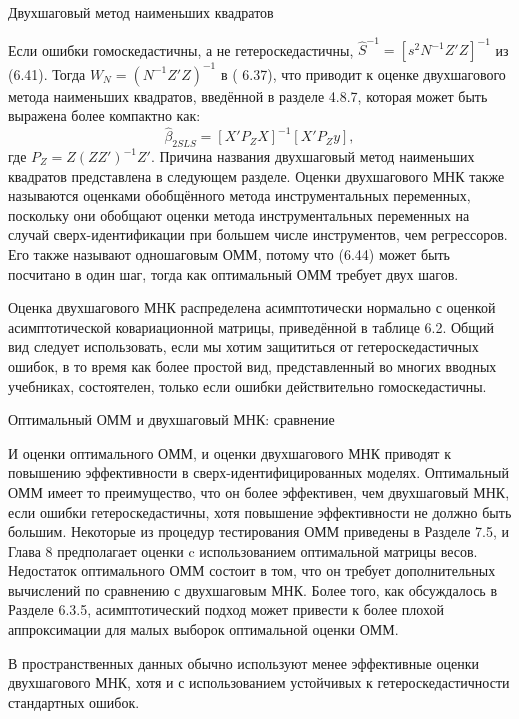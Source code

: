 \begin{center}
Двухшаговый метод наименьших квадратов
\end{center}

Если ошибки гомоскедастичны, а не гетероскедастичны, ${\hat{S}}^{-1}=[s^2 N^{-1} Z' Z]^{-1}$ из (6.41). Тогда $W_N=(N^{-1}Z'Z)^{-1}$ в ( 6.37), что приводит к оценке двухшагового метода наименьших квадратов, введённой в разделе 4.8.7, которая может быть выражена более компактно как:
\begin{equation}
\hat{\beta}_{2SLS}=[X' P_{Z} X]^{-1} [X' P_{Z} y],
\end{equation}
где $P_{Z}=Z(ZZ')^{-1}Z'$. Причина названия двухшаговый метод наименьших квадратов представлена в следующем разделе. Оценки двухшагового МНК также называются оценками обобщённого метода инструментальных переменных, поскольку они обобщают оценки метода инструментальных переменных на случай сверх-идентификации при большем числе инструментов, чем регрессоров. Его также называют одношаговым ОММ, потому что (6.44) может быть посчитано в один шаг, тогда как оптимальный ОММ требует двух шагов.

Оценка двухшагового МНК распределена асимптотически нормально с оценкой асимптотической ковариационной матрицы, приведённой в таблице 6.2. Общий вид следует использовать, если мы хотим защититься от гетероскедастичных ошибок, в то время как более простой вид, представленный во многих вводных учебниках, состоятелен, только если ошибки действительно гомоскедастичны.

\begin{center}
Оптимальный ОММ и двухшаговый МНК: сравнение
\end{center}

И оценки оптимального ОММ, и оценки двухшагового МНК приводят к повышению эффективности в сверх-идентифицированных моделях. Оптимальный ОММ имеет то преимущество, что он более эффективен, чем двухшаговый МНК, если ошибки гетероскедастичны, хотя повышение эффективности не должно быть большим. Некоторые из процедур тестирования ОММ приведены в Разделе 7.5, и Глава 8 предполагает оценки c использованием оптимальной матрицы весов. Недостаток оптимального ОММ состоит в том, что он требует дополнительных вычислений по сравнению с двухшаговым МНК. Более того, как обсуждалось в Разделе 6.3.5, асимптотический подход может привести к более плохой аппроксимации для малых выборок оптимальной оценки ОММ.

В пространственных данных обычно используют менее эффективные оценки двухшагового МНК, хотя и с использованием устойчивых к гетероскедастичности стандартных ошибок.

